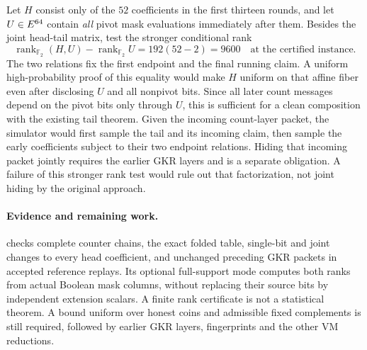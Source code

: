 \documentclass[11pt]{article}
\begin{document}
Let $H$ consist only of the $52$ coefficients in the first thirteen rounds, and let $U\in E^{64}$ contain \emph{all} pivot mask evaluations immediately after them. Besides the joint head-tail matrix, test the stronger conditional rank
\[
 \operatorname{rank}_{\mathbb F_2}(H,U)
 -\operatorname{rank}_{\mathbb F_2}U
 =192(52-2)=9600
 \quad\text{at the certified instance}.
\]
The two relations fix the first endpoint and the final running claim. A uniform high-probability proof of this equality would make $H$ uniform on that affine fiber even after disclosing $U$ and all nonpivot bits. Since all later count messages depend on the pivot bits only through $U$, this is sufficient for a clean composition with the existing tail theorem. Given the incoming count-layer packet, the simulator would first sample the tail and its incoming claim, then sample the early coefficients subject to their two endpoint relations. Hiding that incoming packet jointly requires the earlier GKR layers and is a separate obligation. A failure of this stronger rank test would rule out that factorization, not joint hiding by the original approach.

\paragraph{Evidence and remaining work.}  checks complete counter chains, the exact folded table, single-bit and joint changes to every head coefficient, and unchanged preceding GKR packets in accepted reference replays. Its optional full-support mode computes both ranks from actual Boolean mask columns, without replacing their source bits by independent extension scalars. A finite rank certificate is not a statistical theorem. A bound uniform over honest coins and admissible fixed complements is still required, followed by earlier GKR layers, fingerprints and the other VM reductions.
\end{document}
